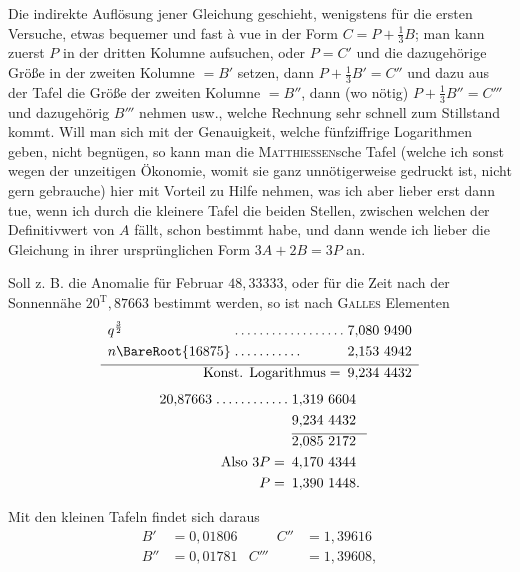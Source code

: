 \noindent\hspace*{\parindent}Die indirekte Auflösung jener Gleichung geschieht, wenigstens für die ersten Versuche, etwas bequemer und fast à vue in der Form \(C=P+\tfrac13B\); man kann zuerst \(P\) in der dritten Kolumne aufsuchen, oder \(P=C'\) und die dazugehörige Größe in der zweiten Kolumne \(=B'\) setzen, dann \(P+\tfrac13B'=C''\) und dazu aus der Tafel die Größe der zweiten Kolumne \(=B''\), dann (wo nötig) \(P+\tfrac13B''=C'''\) und dazugehörig \(B'''\) nehmen usw., welche Rechnung sehr schnell zum Stillstand kommt. Will man sich mit der Genauigkeit, welche fünfziffrige Logarithmen geben, nicht begnügen, so kann man die \textsc{Matthiessen}sche Tafel (welche ich sonst wegen der unzeitigen Ökonomie, womit sie ganz unnötigerweise gedruckt ist, nicht gern gebrauche) hier mit Vorteil zu Hilfe nehmen, was ich aber lieber erst dann tue, wenn ich durch die kleinere Tafel die beiden Stellen, zwischen welchen der Definitivwert von \(A\) fällt, schon bestimmt habe, und dann wende ich lieber die Gleichung in ihrer ursprünglichen Form \(3A+2B=3P\) an.
\par
\noindent\hspace*{\parindent}Soll z. B. die Anomalie für Februar \(48{,}33333\), oder für die Zeit nach der Sonnennähe \(20^{\mathrm T}{,}87663\) bestimmt werden, so ist nach \textsc{Galles} Elementen
\[
\begin{array}{l@{\;}l@{\;}l}
q^{\frac32}&.\,.\,.\,.\,.\,.\,.\,.\,.\,.\,.\,.\,.\,.\,.\,.\,.\,.&7{,}080\ 9490\\[3pt]
n\BareRoot{16875}&.\,.\,.\,.\,.\,.\,.\,.\,.\,.\,.&2{,}153\ 4942\\[3pt]\hline
\multicolumn{2}{r}{\text{Konst. Logarithmus}=}&9{,}234\ 4432
\end{array}
\]
\[
\begin{array}{r@{\;}l@{\;}l}
20{,}87663&.\,.\,.\,.\,.\,.\,.\,.\,.\,.\,.\,.&1{,}319\ 6604\\[3pt]
&&9{,}234\ 4432\\[3pt]\cline{3-3}
&&2{,}085\ 2172\\[3pt]
\multicolumn{2}{r}{\text{Also }3P=}&4{,}170\ 4344\\[3pt]
\multicolumn{2}{r}{P=}&1{,}390\ 1448.
\end{array}
\]
\par
\noindent\hspace*{\parindent}Mit den kleinen Tafeln findet sich daraus
\[
\begin{aligned}
B'&=0{,}01806&\qquad C''&=1{,}39616\\[3pt]
B''&=0{,}01781&C'''&=1{,}39608,
\end{aligned}
\]
